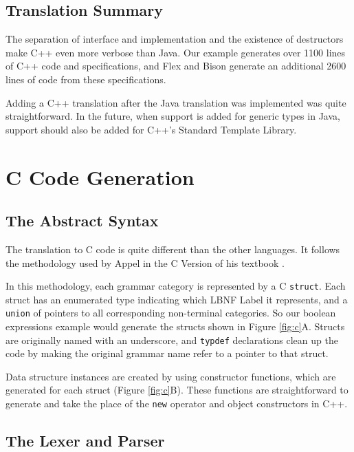 \documentclass{llncs}
\begin{document}
\subsection{Translation Summary}

The separation of interface and implementation and the existence of destructors make C++ even more verbose than Java. Our example generates over 1100 lines of C++ code and specifications, and Flex and Bison generate an additional 2600 lines of code from these specifications.

Adding a C++ translation after the Java translation was implemented was quite straightforward. In the future, when support is added for generic types in Java, support should also be added for C++'s Standard Template Library.



\section{C Code Generation}

\subsection{The Abstract Syntax}

The translation to C code is quite different than the other languages. It follows the methodology used by Appel in the C Version of his textbook \cite{AppelC}.

In this methodology, each grammar category is represented by a C \texttt{struct}. Each struct has an enumerated type indicating which LBNF Label it represents, and a \texttt{union} of pointers to all corresponding non-terminal categories. So our boolean expressions example would generate the structs shown in Figure \ref{fig:c}A. Structs are originally named with an underscore, and \texttt{typdef} declarations clean up the code by making the original grammar name refer to a pointer to that struct.

Data structure instances are created by using constructor functions, which are generated for each struct (Figure \ref{fig:c}B). These functions are straightforward to generate and take the place of the \texttt{new} operator and object constructors in C++.

\subsection{The Lexer and Parser}
\end{document}
